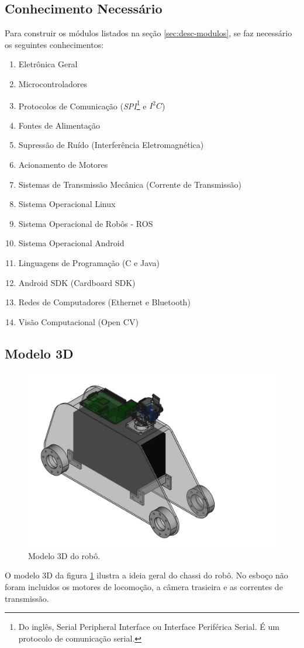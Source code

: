 \documentclass[12pt,a4paper]{article}
\begin{document}
\subsection{Conhecimento Necessário}
	Para construir os módulos listados na seção \ref{sec:desc-modulos}, se faz necessário os seguintes conhecimentos:
\begin{enumerate}[noitemsep]
	\item Eletrônica Geral
	\item Microcontroladores
	\item Protocolos de Comunicação (\emph{SPI}\footnote{Do inglês, Serial Peripheral Interface ou Interface Periférica Serial. É um protocolo de comunicação serial.} e $I^2C$)
	\item Fontes de Alimentação
	\item Supressão de Ruído (Interferência Eletromagnética)
	\item Acionamento de Motores
	\item Sistemas de Transmissão Mecânica (Corrente de Transmissão)
	\item Sistema Operacional Linux
	\item Sistema Operacional de Robôs - ROS
	\item Sistema Operacional Android
	\item Linguagens de Programação (C e Java)
	\item Android SDK (Cardboard SDK)
	\item Redes de Computadores (Ethernet e Bluetooth)
	\item Visão Computacional (Open CV)
\end{enumerate}

\subsection{Modelo 3D}
\begin{figure}[H]
	\centering
	\includegraphics[scale=0.65]{modelo} 
	\caption{Modelo 3D do robô.}
	\label{fig:modelo3d}
\end{figure}
	O modelo 3D da figura \ref{fig:modelo3d} ilustra a ideia geral do chassi do robô. No esboço não foram incluidos os motores de locomoção, a câmera trasieira e as correntes de transmissão.
\end{document}
